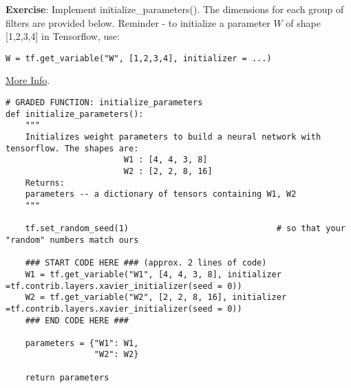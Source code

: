 {\textbf{Exercise}}: Implement initialize\_parameters(). The dimensions for each group of filters are provided below. Reminder - to initialize a parameter $W$ of shape [1,2,3,4] in Tensorflow, use:
\begin{verbatim}
W = tf.get_variable("W", [1,2,3,4], initializer = ...)
\end{verbatim}
\href{https://www.tensorflow.org/api_docs/python/tf/get_variable}{More Info}.

\begin{verbatim}
# GRADED FUNCTION: initialize_parameters
def initialize_parameters():
    """
    Initializes weight parameters to build a neural network with tensorflow. The shapes are:
                        W1 : [4, 4, 3, 8]
                        W2 : [2, 2, 8, 16]
    Returns:
    parameters -- a dictionary of tensors containing W1, W2
    """
    
    tf.set_random_seed(1)                              # so that your "random" numbers match ours
        
    ### START CODE HERE ### (approx. 2 lines of code)
    W1 = tf.get_variable("W1", [4, 4, 3, 8], initializer =tf.contrib.layers.xavier_initializer(seed = 0))
    W2 = tf.get_variable("W2", [2, 2, 8, 16], initializer =tf.contrib.layers.xavier_initializer(seed = 0))
    ### END CODE HERE ###

    parameters = {"W1": W1,
                  "W2": W2}
    
    return parameters
\end{verbatim}



